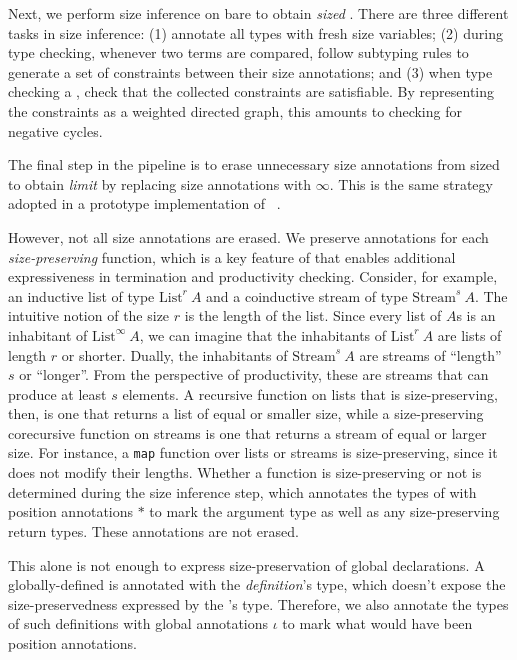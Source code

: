 Next, we perform size inference on bare \lang to obtain \emph{sized} \lang.
There are three different tasks in size inference: (1) annotate all \coinductive types with fresh size variables; (2) during type checking, whenever two terms are compared, follow subtyping rules to generate a set of constraints between their size annotations; and (3) when type checking a \cofixpoint, check that the collected constraints are satisfiable.
By representing the constraints as a weighted directed graph, this amounts to checking for negative cycles.

The final step in the pipeline is to erase unnecessary size annotations from sized \lang to obtain \emph{limit} \lang by replacing size annotations with $\infty$.
This is the same strategy adopted in a prototype implementation of \CIChatminus~\citep{cicminus}.

However, not all size annotations are erased.
We preserve annotations for each \emph{size-preserving} \corecursive function, which is a key feature of \lang that enables additional expressiveness in termination and productivity checking.
Consider, for example, an inductive list of type $\text{List}^r ~ A$ and a coinductive stream of type $\text{Stream}^s ~ A$.
The intuitive notion of the size $r$ is the length of the list.
Since every list of $A$s is an inhabitant of $\text{List}^\infty ~ A$, we can imagine that the inhabitants of $\text{List}^r ~ A$ are lists of length $r$ or shorter.
Dually, the inhabitants of $\text{Stream}^s ~ A$ are streams of ``length'' $s$ or ``longer''.
From the perspective of productivity, these are streams that can produce at least $s$ elements.
A recursive function on lists that is size-preserving, then, is one that returns a list of equal or smaller size, while a size-preserving corecursive function on streams is one that returns a stream of equal or larger size.
For instance, a \texttt{map} function over lists or streams is size-preserving, since it does not modify their lengths.
Whether a \corecursive function is size-preserving or not is determined during the size inference step, which annotates the types of \cofixpoints with position annotations $*$ to mark the \corecursive argument type as well as any size-preserving return types.
These annotations are not erased.

This alone is not enough to express size-preservation of global declarations.
A globally-defined \cofixpoint is annotated with the \emph{definition}'s type, which doesn't expose the size-preservedness expressed by the \emph{\cofixpoint}'s type.
Therefore, we also annotate the types of such definitions with global annotations $\iota$ to mark what would have been position annotations.

